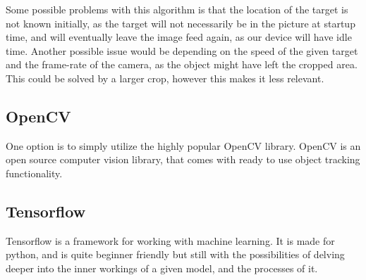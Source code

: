 Some possible problems with this algorithm is that the location of the target is not known initially, as the target will not necessarily be in the picture at startup time, and will eventually leave the image feed again, as our device will have idle time.
Another possible issue would be depending on the speed of the given target and the frame-rate of the camera, as the object might have left the cropped area. 
This could be solved by a larger crop, however this makes it less relevant.

\subsection{OpenCV}
One option is to simply utilize the highly popular OpenCV library.
OpenCV is an open source computer vision library, that comes with ready to use object tracking functionality.



\subsection{Tensorflow}
Tensorflow is a framework for working with machine learning.
It is made for python, and is quite beginner friendly but still with the possibilities of delving deeper into the inner workings of a given model, and the processes of it.




